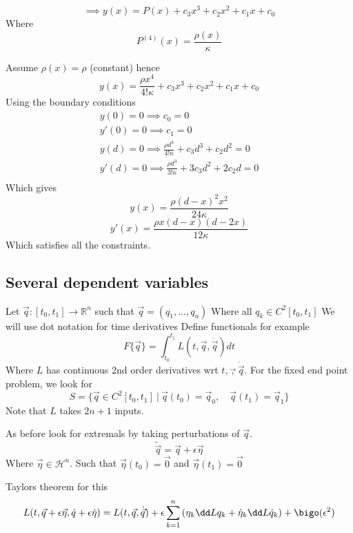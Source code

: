 \documentclass{X:/Documents/Coding/Latex/myassignment}
\begin{document}
\[\implies y(x) = P(x) + c_3x^3 + c_2x^2 + c_1x + c_0\]
Where
\[P^{(4)}(x) = \frac{\rho(x)}{\kappa}\]

Assume $\rho(x) = \rho$ (constant) hence
\[y(x) =\frac{\rho x^4}{4! \kappa}  + c_3x^3 + c_2x^2 + c_1x + c_0\]
Using the boundary conditions
\begin{align*}
y(0) = 0 \implies c_0 = 0\\
y'(0) = 0 \implies c_1 = 0\\
y(d) = 0 \implies \frac{\rho d^4}{4! \kappa} + c_3 d^3 + c_2 d^2 =0\\
y'(d) = 0 \implies \frac{\rho d^3}{3! \kappa} + 3c_3 d^2 + 2c_2 d =0\\
\end{align*}
Which gives
\[y(x) = \frac{\rho(d-x)^2 x^2}{24 \kappa}\]
\[y'(x) = \frac{\rho x (d-x ) (d-2x)}{12 \kappa}\]
Which satisfies all the constraints.

\subsection{Several dependent variables}
Let $\vec q : [t_0,t_1] \to \mathbb{R}^n$ such that $\vec q = (q_1,\ldots,q_n)$
Where all $q_k\in C^2 [t_0,t_1]$
We will use dot notation for time derivatives
Define functionals for example
\[F\{\vec q\} = \int_{t_0}^{t_1} L (t,\vec q, \dot{\vec q}) dt\]
Where $L$ has continuous 2nd order derivatives wrt $t,\vec ,\dot{\vec q}$.
For the fixed end point problem, we look for
\[S = \{\vec q \in C^2[t_0,t_1]\ |\ \vec q(t_0) = \vec q_0, \quad \vec q(t_1) = \vec q_1\}\]
Note that $L$ takes $2n+1$ inputs.

As before look for extremals by taking perturbations of $\vec q$.
\[\tilde{\vec q} = \vec q + \epsilon \vec \eta\]
Where $\vec \eta \in \mathcal{H}^n$.
Such that $\vec \eta(t_0) = \vec 0$ and $\vec \eta(t_1) = \vec 0$

Taylors theorem for this
\[L(t,\vec q+ \epsilon \vec \eta, \dot q+ \epsilon \dot \eta) = L(t,\vec q,\dot {\vec q}) + \epsilon \sum_{k=1}^n \left(\eta_k \dd L{q_k} + \dot{\eta}_k \dd L{\dot q_k}\right) + \bigo(\epsilon^2)\]
\end{document}
